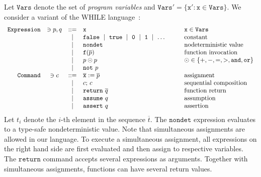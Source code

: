 
Let $\mathtt{Vars}$ denote the set of \emph{program variables} and
$\mathtt{Vars}' = \{ \mathtt{x}' : \mathtt{x} \in \mathtt{Vars} \}$.
We consider a variant of the WHILE language~\cite{NielsonHC99}:
\begin{equation*}
  \begin{array}{rccll}
    \mathtt{Expression} & \ni p, q & ::= &
    \mathtt{x} & \mathtt{x} \in \mathtt{Vars}\\
    & & \mid &
    \mathtt{false}\ \mid\ \mathtt{true}\ \mid\ 
    \mathtt{0}\ \mid\ \mathtt{1}\ \mid\ \ldots\hspace{.06\textwidth} &
    \textmd{constant}\\
    & & \mid &
    \mathtt{nondet} & \textmd{nodeterministic value}\\
    & & \mid &
    \mathtt{f}(\overline{p}) &
    \textmd{function invocation}\\
    & & \mid &
    p \odot p  & \odot \in \{ +, -, =, >, \mathtt{and}, \mathtt{or} \}\\
    & & \mid & \mathtt{not}\ p\\
    \mathtt{Command} & \ni c & ::= &
    \overline{\mathtt{x}} := \overline{p}
    & \textmd{assignment}\\
    & & \mid &
    c\mathtt{;}\ c &
    \textmd{sequential composition}\\
    & & \mid &
    \mathtt{return}\ \overline{q} & \textmd{function return}\\
    & & \mid &
    \mathtt{assume}\ q & \textmd{assumption}\\
    & & \mid &
    \mathtt{assert}\ q & \textmd{assertion}
  \end{array}
\end{equation*}
Let $t_i$ denote the $i$-th element in the sequence $\overline{t}$.
The $\mathtt{nondet}$ expression evaluates to a type-safe
nondeterministic value.
Note that simultaneous assignments are allowed in our language. To
execute a simultaneous assignment, all expressions on the right hand
side are first evaluated and then assign to respective variables. 
The $\mathtt{return}$ command accepts several expressions as arguments.
Together with simultaneous assignments, functions can have several
return values. 


